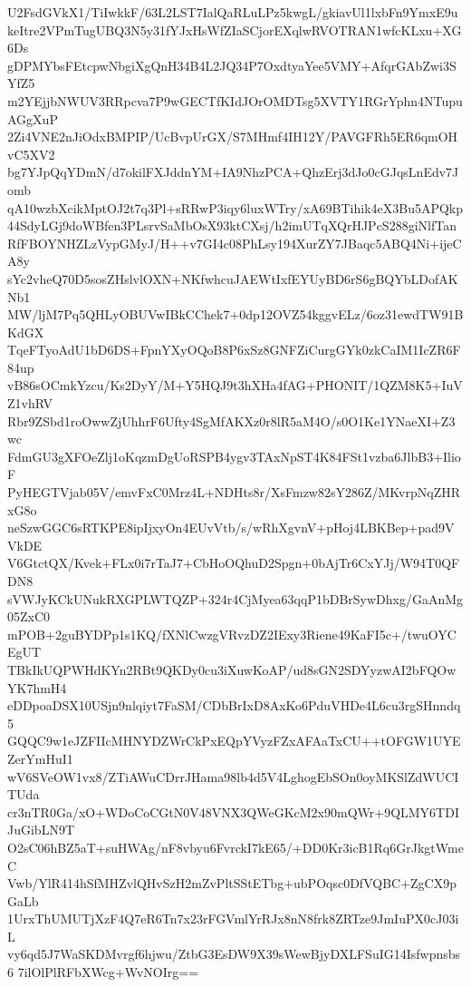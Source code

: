 U2FsdGVkX1/TiIwkkF/63L2LST7IalQaRLuLPz5kwgL/gkiavUl1lxbFn9YmxE9u
keItre2VPmTugUBQ3N5y31fYJxHsWfZIaSCjorEXqlwRVOTRAN1wfcKLxu+XG6Ds
gDPMYbsFEtcpwNbgiXgQnH34B4L2JQ34P7OxdtyaYee5VMY+AfqrGAbZwi3SYfZ5
m2YEjjbNWUV3RRpcva7P9wGECTfKIdJOrOMDTsg5XVTY1RGrYphn4NTupuAGgXuP
2Zi4VNE2nJiOdxBMPIP/UcBvpUrGX/S7MHmf4IH12Y/PAVGFRh5ER6qmOHvC5XV2
bg7YJpQqYDmN/d7okilFXJddnYM+IA9NhzPCA+QhzErj3dJo0cGJqsLnEdv7Jomb
qA10wzbXcikMptOJ2t7q3Pl+sRRwP3iqy6luxWTry/xA69BTihik4eX3Bu5APQkp
44SdyLGj9doWBfen3PLsrvSaMbOsX93ktCXsj/h2imUTqXQrHJPcS288giNlfTan
RfFBOYNHZLzVypGMyJ/H++v7GI4c08PhLsy194XurZY7JBaqc5ABQ4Ni+ijeCA8y
sYc2vheQ70D5sosZHslvlOXN+NKfwhcuJAEWtIxfEYUyBD6rS6gBQYbLDofAKNb1
MW/ljM7Pq5QHLyOBUVwIBkCChek7+0dp12OVZ54kggvELz/6oz31ewdTW91BKdGX
TqeFTyoAdU1bD6DS+FpnYXyOQoB8P6xSz8GNFZiCurgGYk0zkCaIM1IcZR6F84up
vB86sOCmkYzcu/Ks2DyY/M+Y5HQJ9t3hXHa4fAG+PHONIT/1QZM8K5+IuVZ1vhRV
Rbr9ZSbd1roOwwZjUhhrF6Ufty4SgMfAKXz0r8lR5aM4O/s0O1Ke1YNaeXI+Z3wc
FdmGU3gXFOeZlj1oKqzmDgUoRSPB4ygv3TAxNpST4K84FSt1vzba6JlbB3+IlioF
PyHEGTVjab05V/emvFxC0Mrz4L+NDHts8r/XsFmzw82sY286Z/MKvrpNqZHRxG8o
neSzwGGC6sRTKPE8ipIjxyOn4EUvVtb/s/wRhXgvnV+pHoj4LBKBep+pad9VVkDE
V6GtctQX/Kvek+FLx0i7rTaJ7+CbHoOQhuD2Spgn+0bAjTr6CxYJj/W94T0QFDN8
sVWJyKCkUNukRXGPLWTQZP+324r4CjMyea63qqP1bDBrSywDhxg/GaAnMg05ZxC0
mPOB+2guBYDPp1s1KQ/fXNlCwzgVRvzDZ2IExy3Riene49KaFI5c+/twuOYCEgUT
TBkIkUQPWHdKYn2RBt9QKDy0cu3iXuwKoAP/ud8sGN2SDYyzwAI2bFQOwYK7hmH4
eDDpoaDSX10USjn9nlqiyt7FaSM/CDbBrIxD8AxKo6PduVHDe4L6cu3rgSHnndq5
GQQC9w1eJZFIIcMHNYDZWrCkPxEQpYVyzFZxAFAaTxCU++tOFGW1UYEZerYmHuI1
wV6SVeOW1vx8/ZTiAWuCDrrJHama98lb4d5V4LghogEbSOn0oyMKSlZdWUCITUda
cr3nTR0Ga/xO+WDoCoCGtN0V48VNX3QWeGKcM2x90mQWr+9QLMY6TDIJuGibLN9T
O2sC06hBZ5aT+suHWAg/nF8vbyu6FvrckI7kE65/+DD0Kr3icB1Rq6GrJkgtWmeC
Vwb/YlR414hSfMHZvlQHvSzH2mZvPltSStETbg+ubPOqsc0DfVQBC+ZgCX9pGaLb
1UrxThUMUTjXzF4Q7eR6Tn7x23rFGVmlYrRJx8nN8frk8ZRTze9JmIuPX0cJ03iL
vy6qd5J7WaSKDMvrgf6hjwu/ZtbG3EsDW9X39sWewBjyDXLFSuIG14Isfwpnsbs6
7ilOlPlRFbXWcg+WvNOIrg==
